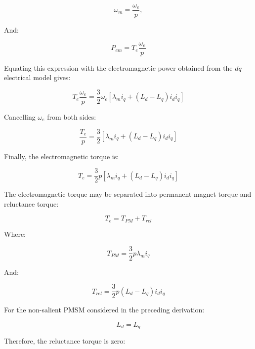\documentclass{article}
\begin{document}
\begin{equation}
    \omega_m = \frac{\omega_e}{p},
\end{equation}

And:

\begin{equation}
    P_{em} = T_e\frac{\omega_e}{p}
\end{equation}

Equating this expression with the electromagnetic power obtained from the $dq$ electrical model gives:

\begin{equation}
    T_e\frac{\omega_e}{p} =
    \frac{3}{2}\omega_e
    \left[
    \lambda_m i_q + (L_d-L_q)i_d i_q
    \right]
\end{equation}

Cancelling $\omega_e$ from both sides:

\begin{equation}
    \frac{T_e}{p} = \frac{3}{2}
    \left[  
    \lambda_m i_q + (L_d-L_q)i_d i_q
    \right]
\end{equation}

Finally, the electromagnetic torque is:

\begin{equation}
    T_e = \frac{3}{2}p
    \left[
    \lambda_m i_q + (L_d-L_q)i_d i_q
    \right]
\end{equation}

The electromagnetic torque may be separated into permanent-magnet torque and reluctance torque:

\begin{equation}
    T_e = T_{PM} + T_{rel}
\end{equation}

Where:

\begin{equation}
    T_{PM} = \frac{3}{2}p\lambda_m i_q
\end{equation}

And:

\begin{equation}
    T_{rel} = \frac{3}{2}p(L_d-L_q)i_d i_q
\end{equation}

For the non-salient PMSM considered in the preceding derivation:

\begin{equation}
    L_d = L_q
\end{equation}

Therefore, the reluctance torque is zero:
\end{document}
